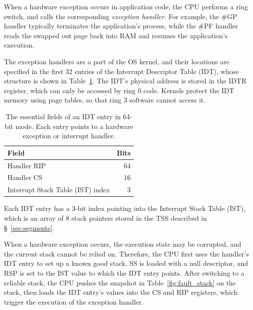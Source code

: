 
When a hardware exception occurs in application code, the CPU performs a ring
switch, and calls the corresponding \textit{exception handler}. For example,
the \#GP handler typically terminates the application's process, while the \#PF
handler reads the swapped out page back into RAM and resumes the application's
execution.

The exception handlers are a part of the OS kernel, and their locations are
specified in the first 32 entries of the Interrupt Descriptor Table (IDT),
whose structure is shown in Table~\ref{fig:idt_entry}. The IDT's physical
address is stored in the IDTR register, which can only be accessed by ring 0
code. Kernels protect the IDT memory using page tables, so that ring 3 software
cannot access it.

\begin{table}[hbt]
  \centering
  \begin{tabular}{| l | r |}
  \hline
  \textbf{Field} & \textbf{Bits} \\
  \hline
  Handler RIP & 64 \\
  \hline
  Handler CS & 16 \\
  \hline
  Interrupt Stack Table (IST) index & 3 \\
  \hline
  \end{tabular}
  \caption{
    The essential fields of an IDT entry in 64-bit mode. Each entry points to a
    hardware exception or interrupt handler.
  }
  \label{fig:idt_entry}
\end{table}

Each IDT entry has a 3-bit index pointing into the Interrupt Stack Table (IST),
which is an array of 8 stack pointers stored in the TSS described in
\S~\ref{sec:segments}.


When a hardware exception occurs, the execution state may be corrupted, and the
current stack cannot be relied on. Therefore, the CPU first uses the handler's
IDT entry to set up a known good stack. SS is loaded with a null descriptor,
and RSP is set to the IST value to which the IDT entry points. After switching
to a reliable stack, the CPU pushes the snapshot in Table~\ref{fig:fault_stack}
on the stack, then loads the IDT entry's values into the CS and RIP registers,
which trigger the execution of the exception handler.


